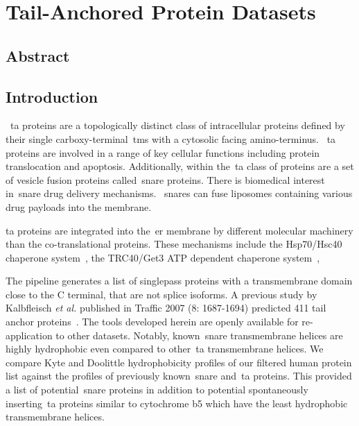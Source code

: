 \chapter{Tail-Anchored Protein Datasets}
\sloppy
\section{Abstract}

\section{Introduction}

~\gls{ta} proteins are a topologically distinct class of intracellular proteins defined by their single carboxy-terminal~\gls{tms} with a cytosolic facing amino-terminus.
~\gls{ta} proteins are involved in a range of key cellular functions including protein translocation and apoptosis.
Additionally, within the~\gls{ta} class of proteins are a set of vesicle fusion proteins called~\gls{snare} proteins.
There is biomedical interest in~\gls{snare} drug delivery mechanisms.
~\gls{snare}s can fuse liposomes containing various drug payloads into the membrane.


\gls{ta} proteins are integrated into the~\gls{er} membrane by different molecular machinery than the co-translational proteins.
These mechanisms include the Hsp70/Hsc40 chaperone system~\cite{Rabu2008}, the TRC40/Get3 ATP dependent chaperone system~\cite{Johnson2013, Chartron2012, Wang2014},


The pipeline generates a list of singlepass proteins with a transmembrane domain close to the C terminal, that are not splice isoforms.
A previous study by Kalbfleisch \textit{et al.} published in Traffic 2007 (8: 1687-1694) predicted 411 tail anchor proteins~\cite{Kalbfleisch2007}.
The tools developed herein are openly available for re-application to other datasets.
Notably, known~\gls{snare} transmembrane helices are highly hydrophobic even compared to other~\gls{ta} transmembrane helices.
We compare Kyte and Doolittle hydrophobicity profiles of our filtered human protein list against the profiles of previously known~\gls{snare} and~\gls{ta} proteins.
This provided a list of potential~\gls{snare} proteins in addition to potential spontaneously inserting~\gls{ta} proteins similar to cytochrome b5 which have the least hydrophobic transmembrane helices.

